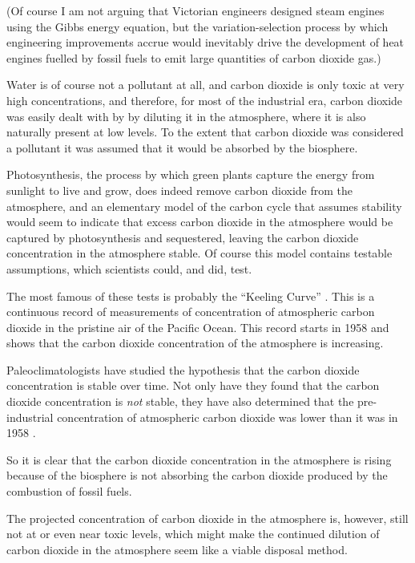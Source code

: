 (Of course I am not arguing that Victorian engineers designed steam engines
using the Gibbs energy equation, but the variation-selection process
\autocite[Chapter 8]{Vincenti1990} by which engineering improvements accrue would
inevitably drive the development of heat engines fuelled by fossil fuels to emit
large quantities of carbon dioxide gas.)

Water is of course not a pollutant at all, and carbon dioxide is only toxic at
very high concentrations, and therefore, for most of the industrial era, carbon
dioxide was easily dealt with by by diluting it in the atmosphere, where it is
also naturally present at low levels. To the extent that carbon dioxide was
considered a pollutant it was assumed that it would be absorbed by the
biosphere.

Photosynthesis, the process by which green plants capture the energy from
sunlight to live and grow, does indeed remove carbon dioxide from the
atmosphere, and an elementary model of the carbon cycle that assumes stability
would seem to indicate that excess carbon dioxide in the atmosphere would be
captured by photosynthesis and sequestered, leaving the carbon dioxide
concentration in the atmosphere stable. Of course this model contains
testable assumptions, which scientists could, and did, test.

The most famous of these tests is probably the ``Keeling Curve''
\autocite{Harris2010}. This is a continuous record of measurements of
concentration of atmospheric carbon dioxide in the pristine air of the Pacific
Ocean. This record starts in 1958 and shows that the carbon dioxide
concentration of the atmosphere is increasing.

Paleoclimatologists have studied the hypothesis that the carbon dioxide
concentration is stable over time. Not only have they found that the carbon
dioxide concentration is \emph{not} stable, they have also determined that the
pre-industrial concentration of atmospheric carbon dioxide was lower than it was
in 1958 \autocite{Petit1999}.

So it is clear that the carbon dioxide concentration in the atmosphere is rising
because of the biosphere is not absorbing the carbon dioxide produced by the
combustion of fossil fuels. 

The projected concentration of carbon dioxide in the atmosphere is, however,
still not at or even near toxic levels, which might make the continued dilution
of carbon dioxide in the atmosphere seem like a viable disposal method.

